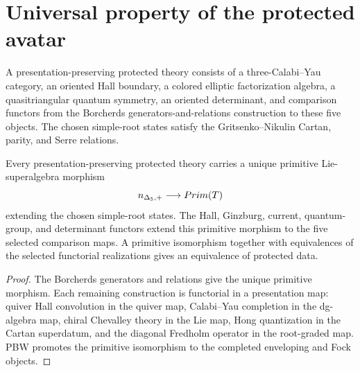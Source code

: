 \chapter{Universal property of the protected avatar}
A presentation-preserving protected theory consists of a three-Calabi--Yau category, an oriented Hall boundary, a colored elliptic factorization algebra, a quasitriangular quantum symmetry, an oriented determinant, and comparison functors from the Borcherds generators-and-relations construction to these five objects.  The chosen simple-root states satisfy the Gritsenko--Nikulin Cartan, parity, and Serre relations.

\begin{theorem}
Every presentation-preserving protected theory carries a unique primitive Lie-superalgebra morphism
\[
 {n_{\Delta_5,+}}\longrightarrow Prim(T)
\]
extending the chosen simple-root states.  The Hall, Ginzburg, current, quantum-group, and determinant functors extend this primitive morphism to the five selected comparison maps.  A primitive isomorphism together with equivalences of the selected functorial realizations gives an equivalence of protected data.
\end{theorem}
\begin{proof}
The Borcherds generators and relations give the unique primitive morphism.  Each remaining construction is functorial in a presentation map: quiver Hall convolution in the quiver map, Calabi--Yau completion in the dg-algebra map, chiral Chevalley theory in the Lie map, Hong quantization in the Cartan superdatum, and the diagonal Fredholm operator in the root-graded map.  PBW promotes the primitive isomorphism to the completed enveloping and Fock objects.
\end{proof}

